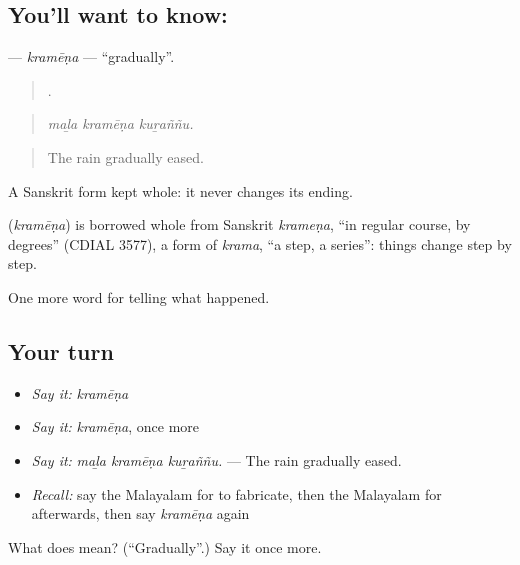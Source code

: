 \subsection*{You'll want to know: }
\textbf{} — \emph{kramēṇa} — \textquotedblleft{}gradually\textquotedblright{}.

\begin{quote}
  .
\end{quote}

\begin{quote}
\emph{maḻa kramēṇa kuṟaññu.}
\end{quote}

\begin{quote}
The rain gradually eased.
\end{quote}

A Sanskrit form kept whole: it never changes its ending.

\begin{cousinweb}
\textbf{} (\emph{kramēṇa}) is borrowed whole from Sanskrit \emph{krameṇa}, \textquotedblleft{}in regular course, by degrees\textquotedblright{} (CDIAL 3577), a form of \emph{krama}, \textquotedblleft{}a step, a series\textquotedblright{}: things change step by step.
\end{cousinweb}

\begin{grammarlens}[title={What you've built}]
One more word for telling what happened.
\end{grammarlens}

\subsection*{Your turn}
\begin{itemize}
\raggedright
  \item \emph{Say it:} \emph{kramēṇa}
  \item \emph{Say it:} \emph{kramēṇa}, once more
  \item \emph{Say it:} \emph{maḻa kramēṇa kuṟaññu.} — The rain gradually eased.
  \item \emph{Recall:} say the Malayalam for to fabricate, then the Malayalam for afterwards, then say \emph{kramēṇa} again
\end{itemize}

\begin{tcolorbox}[breakable,colback=teal!4,colframe=teal!35!black,title={Before you move on}]
What does  mean? (\textquotedblleft{}Gradually\textquotedblright{}.) Say it once more.
\end{tcolorbox}
